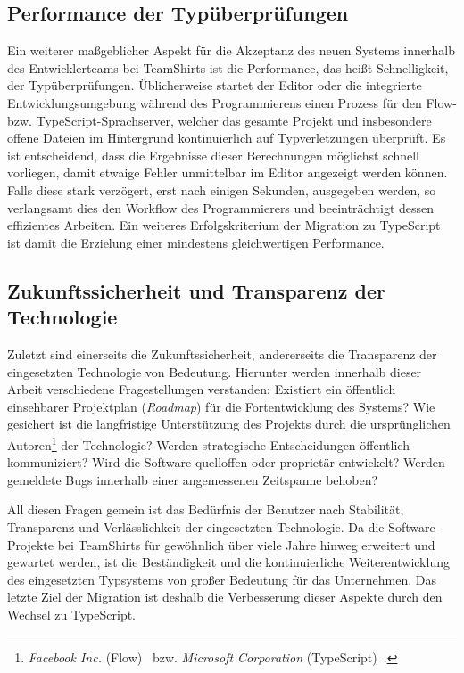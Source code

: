 \subsection{Performance der Typüberprüfungen}

Ein weiterer maßgeblicher Aspekt für die Akzeptanz des neuen Systems innerhalb des Entwicklerteams bei TeamShirts ist die Performance, das heißt Schnelligkeit, der Typüberprüfungen. Üblicherweise startet der Editor oder die integrierte Entwicklungsumgebung während des Programmierens einen Prozess für den Flow- bzw. TypeScript-Sprachserver, welcher das gesamte Projekt und insbesondere offene Dateien im Hintergrund kontinuierlich auf Typverletzungen überprüft. Es ist entscheidend, dass die Ergebnisse dieser Berechnungen möglichst schnell vorliegen, damit etwaige Fehler unmittelbar im Editor angezeigt werden können. Falls diese stark verzögert, erst nach einigen Sekunden, ausgegeben werden, so verlangsamt dies den Workflow des Programmierers und beeinträchtigt dessen effizientes Arbeiten. Ein weiteres Erfolgskriterium der Migration zu TypeScript ist damit die Erzielung einer mindestens gleichwertigen Performance.

\subsection{Zukunftssicherheit und Transparenz der Technologie}

Zuletzt sind einerseits die Zukunftssicherheit, andererseits die Transparenz der eingesetzten Technologie von Bedeutung. Hierunter werden innerhalb dieser Arbeit verschiedene Fragestellungen verstanden: Existiert ein öffentlich einsehbarer Projektplan (\textit{Roadmap}) für die Fortentwicklung des Systems? Wie gesichert ist die langfristige Unterstützung des Projekts durch die ursprünglichen Autoren\footnote{\textit{Facebook Inc.} (Flow)~\autocite{FLOW:PAPER} bzw. \emph{Microsoft Corporation} (TypeScript)~\autocite{TYPESCRIPT:SPEC}.} der Technologie? Werden strategische Entscheidungen öffentlich kommuniziert? Wird die Software quelloffen oder proprietär entwickelt? Werden gemeldete Bugs innerhalb einer angemessenen Zeitspanne behoben?

All diesen Fragen gemein ist das Bedürfnis der Benutzer nach Stabilität, Transparenz und Verlässlichkeit der eingesetzten Technologie. Da die Software-Projekte bei TeamShirts für gewöhnlich über viele Jahre hinweg erweitert und gewartet werden, ist die Beständigkeit und die kontinuierliche Weiterentwicklung des eingesetzten Typsystems von großer Bedeutung für das Unternehmen. Das letzte Ziel der Migration ist deshalb die Verbesserung dieser Aspekte durch den Wechsel zu TypeScript.

